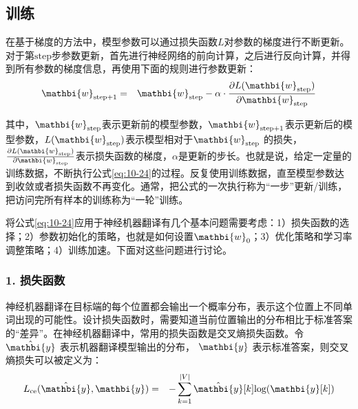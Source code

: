 \subsection{训练}

\parinterval 在基于梯度的方法中，模型参数可以通过损失函数$L$对参数的梯度进行不断更新。对于第$\textrm{step}$步参数更新，首先进行神经网络的前向计算，之后进行反向计算，并得到所有参数的梯度信息，再使用下面的规则进行参数更新：
\begin{eqnarray}
\mathbi{w}_{\textrm{step}+1} &=& \mathbi{w}_{\textrm{step}} - \alpha \cdot \frac{ \partial L(\mathbi{w}_{\textrm{step}})} {\partial \mathbi{w}_{\textrm{step}} }
\label{eq:10-24}
\end{eqnarray}

\noindent 其中，$\mathbi{w}_{\textrm{step}}$表示更新前的模型参数，$\mathbi{w}_{\textrm{step}+1}$表示更新后的模型参数，$L(\mathbi{w}_{\textrm{step}})$表示模型相对于$\mathbi{w}_{\textrm{step}}$ 的损失，$\frac{\partial L(\mathbi{w}_{\textrm{step}})} {\partial \mathbi{w}_{\textrm{step}} }$表示损失函数的梯度，$\alpha$是更新的步长。也就是说，给定一定量的训练数据，不断执行公式\eqref{eq:10-24}的过程。反复使用训练数据，直至模型参数达到收敛或者损失函数不再变化。通常，把公式的一次执行称为“一步”更新/训练，把访问完所有样本的训练称为“一轮”训练。

\parinterval 将公式\eqref{eq:10-24}应用于神经机器翻译有几个基本问题需要考虑：1）损失函数的选择；2）参数初始化的策略，也就是如何设置$\mathbi{w}_0$；3）优化策略和学习率调整策略；4）训练加速。下面对这些问题进行讨论。


\subsubsection{1. 损失函数}

\parinterval 神经机器翻译在目标端的每个位置都会输出一个概率分布，表示这个位置上不同单词出现的可能性。设计损失函数时，需要知道当前位置输出的分布相比于标准答案的“差异”。在神经机器翻译中，常用的损失函数是交叉熵损失函数。令$\hat{\mathbi{y}}$ 表示机器翻译模型输出的分布， $\mathbi{y}$ 表示标准答案，则交叉熵损失可以被定义为：
\begin{eqnarray}
L_{\textrm{ce}}(\hat{\mathbi{y}},\mathbi{y}) &=& - \sum_{k=1}^{|V|} \hat{\mathbi{y}}[k] \textrm{log} (\mathbi{y}[k])
\label{eq:10-25}
\end{eqnarray}

